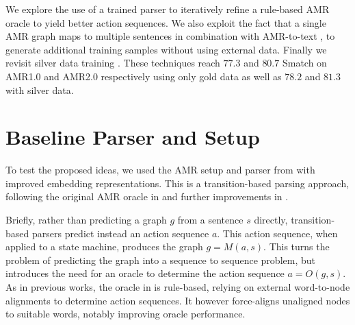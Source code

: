 \documentclass[11pt,a4paper]{article}
\newcommand\crule[3][black]{\textcolor{#1}{\rule{#2}{#3}}}
\begin{document}
We explore the use of a trained parser to iteratively refine a rule-based AMR oracle \cite{ballesteros-al-onaizan-2017-amr,anon2020a} to yield better action sequences. We also exploit the fact that a single AMR graph maps to multiple sentences in combination with AMR-to-text \cite{mager-etal-2020-gpt-too}, to generate additional training samples without using external data. Finally we revisit silver data training \cite{konstas-etal-2017-neural}. These techniques reach $77.3$ and $80.7$ Smatch \cite{cai-knight-2013-smatch} on AMR1.0 and AMR2.0 respectively using only gold data as well as $78.2$ and $81.3$ with silver data. 
 

\section{Baseline Parser and Setup}
\label{section:baseline}
To test the proposed ideas, we used the AMR setup and parser from \cite{anon2020a} with improved embedding representations. This is a transition-based parsing approach, following the original AMR oracle in \cite{ballesteros-al-onaizan-2017-amr} and further improvements in \cite{naseem-etal-2019-rewarding}.

Briefly, rather than predicting a graph $g$ from a sentence $s$ directly, transition-based parsers predict instead an action sequence $a$. This action sequence, when applied to a state machine, produces the graph $g = M(a, s)$. This turns the problem of predicting the graph into a sequence to sequence problem, but introduces the need for an oracle to determine the action sequence $a = O(g, s)$. As in previous works, the oracle in \cite{anon2020a} is rule-based, relying on external word-to-node alignments \cite{flanigan2014discriminative,pourdamghani2016generating} to determine action sequences. It however force-aligns unaligned nodes to suitable words, notably improving oracle performance. 
\end{document}
